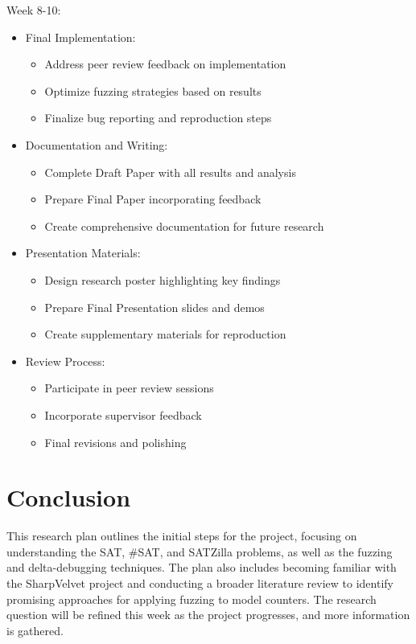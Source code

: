 \documentclass[english, a4paper]{article}
\begin{document}
Week 8-10:
\begin{itemize}
    \item Final Implementation:
    \begin{itemize}
        \item Address peer review feedback on implementation
        \item Optimize fuzzing strategies based on results
        \item Finalize bug reporting and reproduction steps
    \end{itemize}
    
    \item Documentation and Writing:
    \begin{itemize}
        \item Complete Draft Paper with all results and analysis
        \item Prepare Final Paper incorporating feedback
        \item Create comprehensive documentation for future research
    \end{itemize}
    
    \item Presentation Materials:
    \begin{itemize}
        \item Design research poster highlighting key findings
        \item Prepare Final Presentation slides and demos
        \item Create supplementary materials for reproduction
    \end{itemize}
    
    \item Review Process:
    \begin{itemize}
        \item Participate in peer review sessions
        \item Incorporate supervisor feedback
        \item Final revisions and polishing
    \end{itemize}
\end{itemize}

\section*{Conclusion}

This research plan outlines the initial steps for the project, focusing on understanding the SAT, \#SAT, and SATZilla problems, as well as the fuzzing and delta-debugging techniques. The plan also includes becoming familiar with the SharpVelvet project and conducting a broader literature review to identify promising approaches for applying fuzzing to model counters. The research question will be refined this week as the project progresses, and more information is gathered.

\pagebreak

\printbibliography
\end{document}
